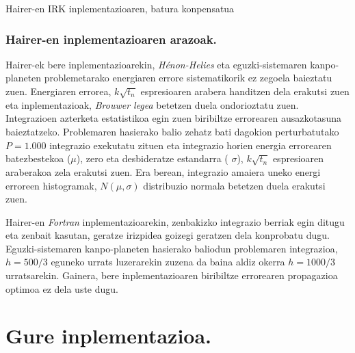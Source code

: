\begin{algorithm}[h!]
  \caption{Hairer-en IRK inplementazioaren, batura konpensatua}
  \label{alg:Hairer-BK}
\end{algorithm} 


\subsubsection*{Hairer-en inplementazioaren arazoak.}

Hairer-ek bere inplementazioarekin, \emph{Hénon-Helies} eta eguzki-sistemaren kanpo-planeten problemetarako energiaren errore sistematikorik ez zegoela baieztatu zuen. Energiaren errorea, $k\sqrt{t_n}$ espresioaren arabera handitzen dela erakutsi zuen eta inplementazioak, \emph{Brouwer legea} \cite{Grazier2005} betetzen duela ondorioztatu zuen. Integrazioen azterketa estatistikoa egin zuen biribiltze errorearen ausazkotasuna baieztatzeko. Problemaren hasierako balio zehatz bati dagokion perturbatutako $P=1.000$ integrazio exekutatu zituen eta integrazio horien energia errorearen batezbestekoa ($\mu$), zero eta desbideratze estandarra ( $\sigma$), $k\sqrt{t_n}$ espresioaren araberakoa zela erakutsi zuen. Era berean, integrazio amaiera uneko energi erroreen histogramak, $N(\mu,\sigma)$ distribuzio normala betetzen duela erakutsi zuen.

Hairer-en \emph{Fortran} inplementazioarekin, zenbakizko integrazio berriak egin ditugu eta zenbait kasutan, geratze irizpidea goizegi geratzen dela konprobatu dugu. Eguzki-sistemaren kanpo-planeten hasierako baliodun problemaren integrazioa,  $h=500/3$ eguneko urrats luzerarekin zuzena da baina aldiz okerra $h=1000/3$ urratsarekin.  Gainera, bere inplementazioaren biribiltze errorearen propagazioa optimoa ez dela uste dugu. 


\section{Gure inplementazioa.}

